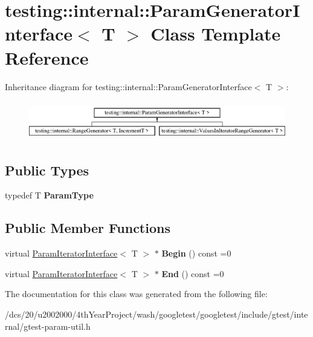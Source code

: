 \hypertarget{classtesting_1_1internal_1_1ParamGeneratorInterface}{}\section{testing\+:\+:internal\+:\+:Param\+Generator\+Interface$<$ T $>$ Class Template Reference}
\label{classtesting_1_1internal_1_1ParamGeneratorInterface}
Inheritance diagram for testing\+:\+:internal\+:\+:Param\+Generator\+Interface$<$ T $>$\+:\begin{figure}[H]
\begin{center}
\leavevmode
\includegraphics[height=1.733746cm]{classtesting_1_1internal_1_1ParamGeneratorInterface}
\end{center}
\end{figure}
\subsection*{Public Types}
\begin{DoxyCompactItemize}
\item 
\mbox{\label{classtesting_1_1internal_1_1ParamGeneratorInterface_ab33d2ea424c50beaf503cb125b3cd003}} 
typedef T {\bfseries Param\+Type}
\end{DoxyCompactItemize}
\subsection*{Public Member Functions}
\begin{DoxyCompactItemize}
\item 
\mbox{\label{classtesting_1_1internal_1_1ParamGeneratorInterface_ae1de83b16fe9a53c67778a026c6a9569}} 
virtual \mbox{\hyperlink{classtesting_1_1internal_1_1ParamIteratorInterface}{Param\+Iterator\+Interface}}$<$ T $>$ $\ast$ {\bfseries Begin} () const =0
\item 
\mbox{\label{classtesting_1_1internal_1_1ParamGeneratorInterface_afa7211b74990e11d3fc7ad4e7113da4f}} 
virtual \mbox{\hyperlink{classtesting_1_1internal_1_1ParamIteratorInterface}{Param\+Iterator\+Interface}}$<$ T $>$ $\ast$ {\bfseries End} () const =0
\end{DoxyCompactItemize}


The documentation for this class was generated from the following file\+:\begin{DoxyCompactItemize}
\item 
/dcs/20/u2002000/4th\+Year\+Project/wash/googletest/googletest/include/gtest/internal/gtest-\/param-\/util.\+h\end{DoxyCompactItemize}
